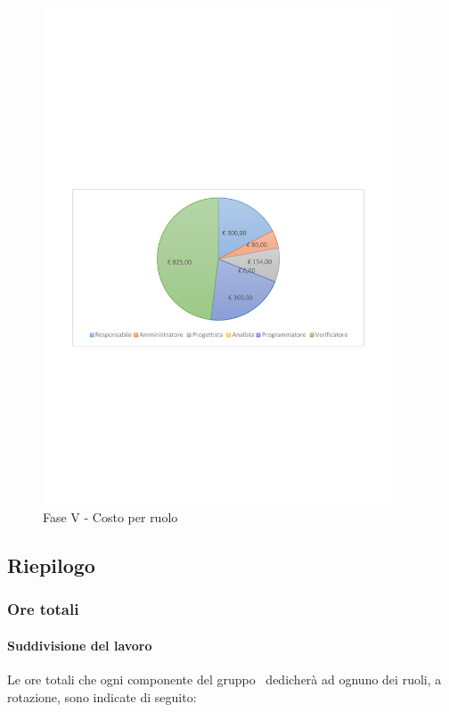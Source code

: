 \documentclass[../PianoProgetto.tex]{subfiles}
\begin{document}
\vfill	
\newpage
	\begin{figure}[!h]
		\centering
		\includegraphics[width=0.93\textwidth , trim=2cm 9.5cm 2cm 11cm]{grafici/V/V-costo}
			\caption{Fase V - Costo per ruolo}
		\label{fig:CircleChart-faseV_costo}
	\end{figure}	
	
	\subsection{Riepilogo}
			\subsubsection{Ore totali}
				\paragraph{Suddivisione del lavoro}
					Le ore totali che ogni componente del gruppo \leaf\ dedicherà ad ognuno dei ruoli, a rotazione, sono indicate di seguito:
	
\end{document}
